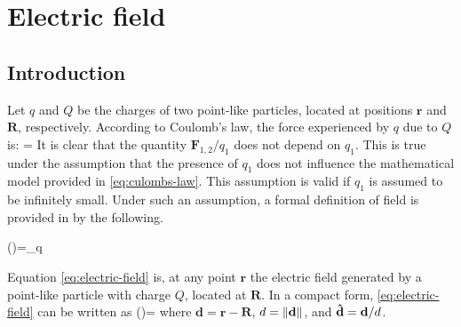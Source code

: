 \chapter{Electric field}
\section{Introduction}
Let $q$ and $Q$ be the charges of two point-like particles, located at positions $\mathbf{r}$ and $\mathbf{R}$, respectively.
According to Coulomb's law, the force experienced by $q$ due to $Q$ is:
\be\label{eq:culombs-law}
=
\ee
It is clear that the quantity $\mathbf{F}_{1,2}/q_{1}$ does not depend on $q_{1}$. This is true under the assumption that the presence of $q_{1}$ does not influence the mathematical model provided in \ref{eq:culombs-law}. This assumption is valid if $q_{1}$ is assumed to be infinitely small. Under such an assumption, a formal definition of field is provided in by the following.

\be\label{eq:electric-field}
()=\lim_{q } 
\ee

Equation \ref{eq:electric-field} is, at any point $\mathbf{r}$ the electric field generated by a point-like particle with charge $Q$, located at $\mathbf{R}$.
In a compact form, \ref{eq:electric-field} can be written as 
\be\label{eq:compact-electric-field}
()=
\ee
where $\mathbf{d}=\mathbf{\mathbf{r}-\mathbf{R}}$, $d=\left\lVert\mathbf{d}\right\rVert$, and $\boldsymbol{\hat{\textbf{$\mathrm d$}}}=\mathbf{d}/d$.

